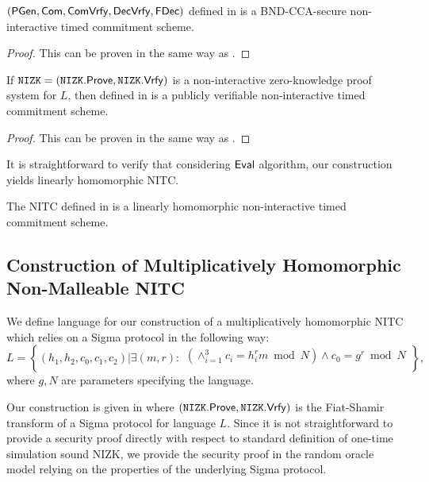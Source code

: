 \begin{theorem}
$(\mathsf{PGen}, \mathsf{Com}, \mathsf{ComVrfy}, \mathsf{DecVrfy}, \mathsf{FDec})$ defined in  is a BND-CCA-secure non-interactive timed commitment scheme. 
\end{theorem}
{}
\begin{proof}
This can be proven in the same way as .
\end{proof}

\begin{theorem}
If $\mathtt{NIZK} = (\mathtt{NIZK}.\mathsf{Prove}, \mathtt{NIZK}.\mathsf{Vrfy})$ is a non-interactive zero-knowledge proof system for $L$, then \mathlist{(\pgen, \com, \cvrfy, \dvrfy, \fdecom, \fdvrfy)} defined in  is a publicly verifiable non-interactive timed commitment scheme.
\end{theorem}

\begin{proof}
This can be proven in the same way as .
\end{proof}

It is straightforward to verify that considering $\mathsf{Eval}$ algorithm, our construction yields linearly homomorphic NITC. 
\begin{theorem}\label{hom-lh-rom}
The NITC \mathlist{(\pgen, \com, \cvrfy, \dvrfy, \fdecom, \fdvrfy, \eval)} defined in  is a linearly homomorphic non-interactive timed commitment scheme.
\end{theorem}









\subsection{Construction of Multiplicatively Homomorphic Non-Malleable NITC}
We define language for our construction of a multiplicatively homomorphic NITC which relies on a Sigma protocol in the following way:
\[
L = \left\{(h_1, h_2, c_0, c_1, c_2)| \exists (m,r):
\begin{aligned}
       (\land_{i=1}^3 c_i = h_i^{r}m \bmod N) \land
       c_0 = g^r \bmod N\\
    \end{aligned}
    \right\}, 
\]
where $g, N$ are parameters specifying the language.

Our construction is given in  where $(\mathtt{NIZK}.\mathsf{Prove}, \mathtt{NIZK}.\mathsf{Vrfy})$ is the Fiat-Shamir transform of a Sigma protocol for language $L$. Since it is not straightforward to provide a security proof directly with respect to standard definition of one-time simulation sound NIZK, we provide the security proof in the random oracle model relying on the properties of the underlying Sigma protocol.



